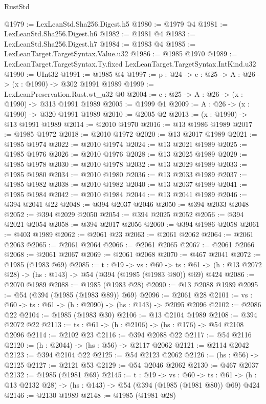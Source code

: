 \begin{lexlean}{RustStd}
\begin{coremodule}
{\begin{coremodule}
{{{{{{{{@1979 := LexLeanStd.Sha256.Digest.h5
@1980 := @1979 @4
@1981 := LexLeanStd.Sha256.Digest.h6
@1982 := @1981 @4
@1983 := LexLeanStd.Sha256.Digest.h7
@1984 := @1983 @4
@1985 := LexLeanTarget.TargetSyntax.Value.u32
@1986 := @1985 @1970
@1989 := LexLeanTarget.TargetSyntax.Ty.fixed LexLeanTarget.TargetSyntax.IntKind.u32
@1990 := UInt32
@1991 := @1985 @4
@1997 := {p : @24} -> {c : @25} -> {A : @26} -> (x : @1990) -> @302 @1991 @1989
@1999 := LexLeanPreservation.Rust.wt_u32 @0
@2004 := {c : @25} -> {A : @26} -> (x : @1990) -> @313 @1991 @1989
@2005 := @1999 @1
@2009 := {A : @26} -> (x : @1990) -> @320 @1991 @1989
@2010 := @2005 @2
@2013 := (x : @1990) -> @13 @1991 @1989
@2014 := @2010 @1970
@2016 := @13 @1986 @1989
@2017 := @1985 @1972
@2018 := @2010 @1972
@2020 := @13 @2017 @1989
@2021 := @1985 @1974
@2022 := @2010 @1974
@2024 := @13 @2021 @1989
@2025 := @1985 @1976
@2026 := @2010 @1976
@2028 := @13 @2025 @1989
@2029 := @1985 @1978
@2030 := @2010 @1978
@2032 := @13 @2029 @1989
@2033 := @1985 @1980
@2034 := @2010 @1980
@2036 := @13 @2033 @1989
@2037 := @1985 @1982
@2038 := @2010 @1982
@2040 := @13 @2037 @1989
@2041 := @1985 @1984
@2042 := @2010 @1984
@2044 := @13 @2041 @1989
@2046 := @394 @2041 @22
@2048 := @394 @2037 @2046
@2050 := @394 @2033 @2048
@2052 := @394 @2029 @2050
@2054 := @394 @2025 @2052
@2056 := @394 @2021 @2054
@2058 := @394 @2017 @2056
@2060 := @394 @1986 @2058
@2061 := @403 @1989
@2062 := @2061 @23
@2063 := @2061 @2062
@2064 := @2061 @2063
@2065 := @2061 @2064
@2066 := @2061 @2065
@2067 := @2061 @2066
@2068 := @2061 @2067
@2069 := @2061 @2068
@2070 := @467 @2041
@2072 := @1985 (@1983 @69)
@2085 := {t : @19} ->
  {vs : @60} ->
  {ts : @61} -> (h : @13 @2072 @28) -> (hs : @143) -> @54 (@394 (@1985 (@1983 @80)) @69) @424
@2086 := @2070 @1989
@2088 := @1985 (@1983 @28)
@2090 := @13 @2088 @1989
@2095 := @54 (@394 (@1985 (@1983 @89)) @69)
@2096 := @2061 @28
@2101 := {vs : @60} -> {ts : @61} -> (h : @2090) -> (hs : @143) -> @2095 @2096
@2102 := @2086 @22
@2104 := @1985 (@1983 @30)
@2106 := @13 @2104 @1989
@2108 := @394 @2072 @22
@2113 := {ts : @61} -> (h : @2106) -> (hs : @176) -> @54 @2108 @2096
@2114 := @2102 @23
@2116 := @394 @2088 @22
@2117 := @54 @2116
@2120 := (h : @2044) -> (hs : @56) -> @2117 @2062
@2121 := @2114 @2042
@2123 := @394 @2104 @22
@2125 := @54 @2123 @2062
@2126 := (hs : @56) -> @2125
@2127 := @2121 @53
@2129 := @54 @2046 @2062
@2130 := @467 @2037
@2132 := @1985 (@1981 @69)
@2145 := {t : @19} ->
  {vs : @60} ->
  {ts : @61} -> (h : @13 @2132 @28) -> (hs : @143) -> @54 (@394 (@1985 (@1981 @80)) @69) @424
@2146 := @2130 @1989
@2148 := @1985 (@1981 @28)
}}}}}}}}
\end{coremodule}}
\end{coremodule}
\end{lexlean}
